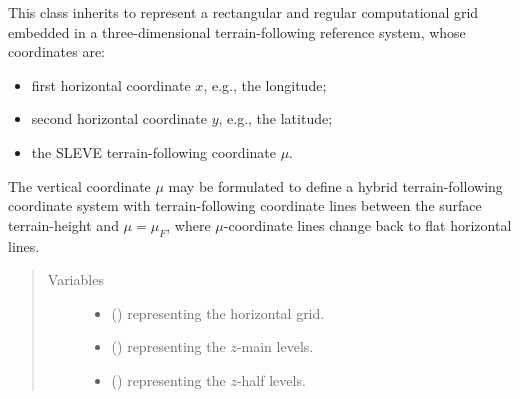 \documentclass[letterpaper,10pt,english]{sphinxmanual}
\begin{document}
\begin{fulllineitems}
\label{\detokenize{api:grids.sleve.SLEVE3d}}
This class inherits {\hyperref[\detokenize{api:grids.grid_xyz.GridXYZ}]{}} to represent a rectangular and regular computational grid
embedded in a three-dimensional terrain-following reference system, whose coordinates are:
\begin{itemize}
\item {} 
first horizontal coordinate \(x\), e.g., the longitude;

\item {} 
second horizontal coordinate \(y\), e.g., the latitude;

\item {} 
the SLEVE terrain-following coordinate \(\mu\).

\end{itemize}

The vertical coordinate \(\mu\) may be formulated to define a hybrid terrain-following coordinate system
with terrain-following coordinate lines between the surface terrain-height and \(\mu = \mu_F\), where
\(\mu\)-coordinate lines change back to flat horizontal lines.
\begin{quote}\begin{description}
\item[{Variables}] \leavevmode\begin{itemize}
\item {} 
 () \textendash{} {\hyperref[\detokenize{api:grids.grid_xy.GridXY}]{}} representing the horizontal grid.

\item {} 
 () \textendash{} {\hyperref[\detokenize{api:grids.axis.Axis}]{}} representing the \(z\)-main levels.

\item {} 
 () \textendash{} {\hyperref[\detokenize{api:grids.axis.Axis}]{}} representing the \(z\)-half levels.


\end{itemize}
\end{description}
\end{quote}
\end{fulllineitems}
\end{document}
